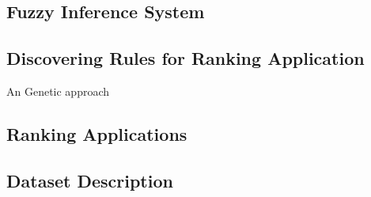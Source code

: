 \subsection{Fuzzy Inference System}

\subsection{Discovering Rules for Ranking Application}
An Genetic approach

\subsection{Ranking Applications}


%
\subsection{Dataset Description}

